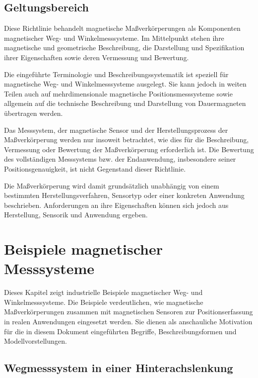 \documentclass[
  ngerman,
  a4paper,
  twoside]{scrbook}
\begin{document}
\section{Geltungsbereich}\label{geltungsbereich}

Diese Richtlinie behandelt magnetische Maßverkörperungen als Komponenten
magnetischer Weg- und Winkelmesssysteme. Im Mittelpunkt stehen ihre
magnetische und geometrische Beschreibung, die Darstellung und
Spezifikation ihrer Eigenschaften sowie deren Vermessung und Bewertung.

Die eingeführte Terminologie und Beschreibungssystematik ist speziell
für magnetische Weg- und Winkelmesssysteme ausgelegt. Sie kann jedoch in
weiten Teilen auch auf mehrdimensionale magnetische Positionsmesssysteme
sowie allgemein auf die technische Beschreibung und Darstellung von
Dauermagneten übertragen werden.

Das Messsystem, der magnetische Sensor und der Herstellungsprozess der
Maßverkörperung werden nur insoweit betrachtet, wie dies für die
Beschreibung, Vermessung oder Bewertung der Maßverkörperung erforderlich
ist. Die Bewertung des vollständigen Messsystems bzw. der Endanwendung,
insbesondere seiner Positionsgenauigkeit, ist nicht Gegenstand dieser
Richtlinie.

Die Maßverkörperung wird damit grundsätzlich unabhängig von einem
bestimmten Herstellungsverfahren, Sensortyp oder einer konkreten
Anwendung beschrieben. Anforderungen an ihre Eigenschaften können sich
jedoch aus Herstellung, Sensorik und Anwendung ergeben.


\chapter{Beispiele magnetischer Messsysteme}\label{sec-sec02}

Dieses Kapitel zeigt industrielle Beispiele magnetischer Weg- und
Winkelmesssysteme. Die Beispiele verdeutlichen, wie magnetische
Maßverkörperungen zusammen mit magnetischen Sensoren zur
Positionserfassung in realen Anwendungen eingesetzt werden. Sie dienen
als anschauliche Motivation für die in diesem Dokument eingeführten
Begriffe, Beschreibungsformen und Modellvorstellungen.

\section{Wegmesssystem in einer
Hinterachslenkung}\label{sec-sec02-hinterachslenkung}
\end{document}
